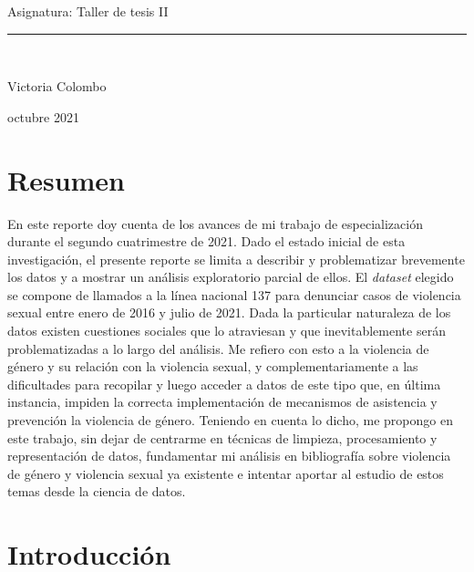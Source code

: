 \documentclass[10 pt]{article}
\begin{document}
\begin{titlepage}
\begin{center}
\begin{large}
Asignatura: Taller de tesis II \\
\end{large}

\vspace*{0.3in}
\rule{80mm}{0.1mm}\\
\vspace*{0.1in}
\begin{large}
Victoria Colombo

\vspace*{0.3in}

\vspace*{0.1in}octubre 2021
\end{large}
\end{center}

\end{titlepage}


\newpage

\section*{Resumen}

En este reporte doy cuenta de los avances de mi trabajo de especialización durante el segundo cuatrimestre de 2021. Dado el estado inicial de esta investigación, el presente reporte se limita a describir y problematizar brevemente los datos y a mostrar un análisis exploratorio parcial de ellos. El \textit{dataset} elegido se compone de llamados a la línea nacional 137 para denunciar casos de violencia sexual entre enero de 2016 y julio de 2021. Dada la particular naturaleza de los datos existen cuestiones sociales que lo atraviesan y que inevitablemente serán problematizadas a lo largo del análisis. Me refiero con esto a la violencia de género y su relación con la violencia sexual, y complementariamente a las dificultades para recopilar y luego acceder a datos de este tipo que, en última instancia, impiden la correcta implementación de mecanismos de asistencia y prevención la violencia de género. Teniendo en cuenta lo dicho, me propongo en este trabajo, sin dejar de centrarme en técnicas de limpieza, procesamiento y representación de datos, fundamentar mi análisis en bibliografía sobre violencia de género y violencia sexual ya existente e intentar aportar al estudio de estos temas desde la ciencia de datos.



\section*{Introducción}\label{intro}
\end{document}
